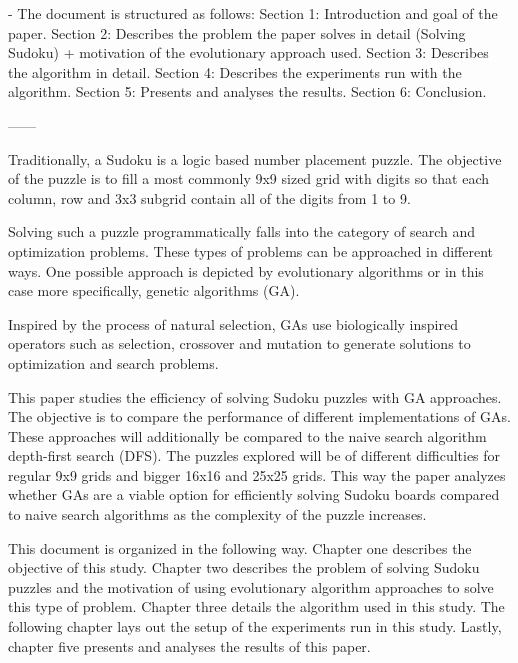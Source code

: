 - The document is structured as follows:
Section 1: Introduction and goal of the paper.
Section 2: Describes the problem the paper solves in detail (Solving Sudoku) + motivation of the evolutionary approach used.
Section 3: Describes the algorithm in detail.
Section 4: Describes the experiments run with the algorithm.
Section 5: Presents and analyses the results.
Section 6: Conclusion.

------
 
Traditionally, a Sudoku is a logic based number placement puzzle. The objective of the puzzle is to fill a most commonly 9x9 sized grid with digits so that each column, row and 3x3 subgrid contain all of the digits from 1 to 9.\cite{}

Solving such a puzzle programmatically falls into the category of search and optimization problems. These types of problems can be approached in different ways. One possible approach is depicted by evolutionary algorithms or in this case more specifically, genetic algorithms (GA)\cite{WikiSudoku}.

Inspired by the process of natural selection, GAs use biologically inspired operators such as selection, crossover and mutation to generate solutions to optimization and search problems\cite{WikiGA}.

This paper studies the efficiency of solving Sudoku puzzles with GA approaches. The objective is to compare the performance of different implementations of GAs. These approaches will additionally be compared to the naive search algorithm depth-first search (DFS). The puzzles explored will be of different difficulties for regular 9x9 grids and bigger 16x16 and 25x25 grids. This way the paper analyzes whether GAs are a viable option for efficiently solving Sudoku boards compared to naive search algorithms as the complexity of the puzzle increases.

This document is organized in the following way. Chapter one describes the objective of this study. Chapter two describes the problem of solving Sudoku puzzles and the motivation of using evolutionary algorithm approaches to solve this type of problem. Chapter three details the algorithm used in this study. The following chapter lays out the setup of the experiments run in this study. Lastly, chapter five presents and analyses the results of this paper.